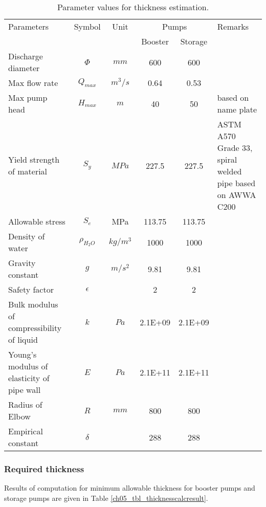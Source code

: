 \begin{table}[h]
	\caption{Parameter values for thickness estimation.}
	\label{ch05_tbl_thicknesscalc}
	{\footnotesize
\begin{tabular}{p{4cm}|c|c|c|c|p{4cm}}
	\hline
	Parameters & Symbol & Unit & \multicolumn{2}{c|}{Pumps} & Remarks \\ 
	&  &  & Booster & Storage &  \\ 
	\hline
	Discharge diameter & $\Phi$ & $mm$ & 600 & 600 &  \\ 
	Max flow rate & $Q_{max}$ & $m^3/s$ & 0.64 & 0.53 &  \\ 
	Max pump head & $H_{max}$ & $m$ & 40 & 50 & based on name plate \\ 
	Yield strength of material & $S_y$ & $MPa$ & 227.5 & 227.5 & ASTM A570 Grade 33, spiral welded pipe based on AWWA C200 \\ 
	Allowable stress & $S_e$ & MPa & 113.75 & 113.75 &  \\ 
	Density of water & $\rho_{H_2O}$ & $kg/m^3$ & 1000 & 1000 &  \\ 
	Gravity constant & $g$ & $m/s^2$ & 9.81 & 9.81 &  \\ 
	Safety factor & $\epsilon$ &  & 2 & 2 &  \\ 
	Bulk modulus of compressibility of liquid & $k$ & $Pa$ & 2.1E+09 & 2.1E+09 &  \\ 
	Young's modulus of elasticity of pipe wall & $E$ & $Pa$ & 2.1E+11 & 2.1E+11 &  \\ 
	Radius of Elbow & $R$ & $mm$ & 800 & 800 &  \\ 
	Empirical constant & $\delta$ &  & 288 & 288 &  \\ 
	\hline
\end{tabular}
	}
\end{table}

\subsubsection{Required thickness}

Results of computation for minimum allowable thickness for booster pumps and storage pumps are given in Table \ref{ch05_tbl_thicknesscalcresult}.

